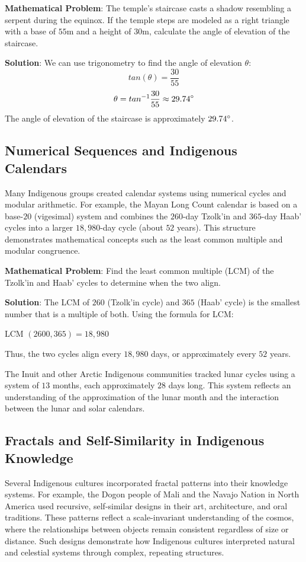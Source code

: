 \documentclass{article}
\begin{document}
\begin{multicols}{2}
\textbf{Mathematical Problem}: The temple’s staircase casts a shadow resembling a serpent during the equinox. If the temple steps are modeled as a right triangle with a base of $55$m and a height of $30$m, calculate the angle of elevation of the staircase.

\textbf{Solution}:
We can use trigonometry to find the angle of elevation $\theta$:
\begin{equation*}
   tan(\theta) = \frac{30}{55}
\end{equation*}
\begin{equation*}
\theta = tan^{-1} \frac{30}{55} \approx 29.74 \degree
\end{equation*}
The angle of elevation of the staircase is approximately $29.74 \degree$.
\subsection*{Numerical Sequences and Indigenous Calendars}
Many Indigenous groups created calendar systems using numerical cycles and modular arithmetic. For example, the Mayan Long Count calendar is based on a base-$20$ (vigesimal) system and combines the $260$-day Tzolk’in and $365$-day Haab’ cycles into a larger $18,980$-day cycle (about $52$ years). This structure demonstrates mathematical concepts such as the least common multiple and modular congruence.

\textbf{Mathematical Problem}:   Find the least common multiple (LCM) of the Tzolk'in and Haab' cycles to determine when the two align.

\textbf{Solution}:   The LCM of $260$ (Tzolk'in cycle) and $365$ (Haab' cycle) is the smallest number that is a multiple of both. Using the formula for LCM:
\begin{center}
LCM $(2600,365) = 18,980$
\end{center}
Thus, the two cycles align every $18,980$ days, or approximately every $52$ years.

The Inuit and other Arctic Indigenous communities tracked lunar cycles using a system of $13$ months, each approximately $28$ days long. This system reflects an understanding of the approximation of the lunar month and the interaction between the lunar and solar calendars.

\subsection*{Fractals and Self-Similarity in Indigenous Knowledge}
Several Indigenous cultures incorporated fractal patterns into their knowledge systems. For example, the Dogon people of Mali and the Navajo Nation in North America used recursive, self-similar designs in their art, architecture, and oral traditions. These patterns reflect a scale-invariant understanding of the cosmos, where the relationships between objects remain consistent regardless of size or distance. Such designs demonstrate how Indigenous cultures interpreted natural and celestial systems through complex, repeating structures.


\end{multicols}
\end{document}
